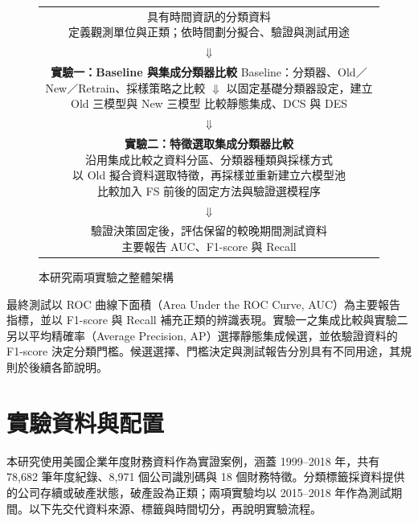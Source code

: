 \begin{figure}[htbp]
\centering
\begingroup
\small
{}
\setlength{\fboxsep}{8pt}
\begin{tabular}{@{}c@{}}
\fbox{\parbox{0.88\linewidth}{\centering 具有時間資訊的分類資料\\
定義觀測單位與正類；依時間劃分擬合、驗證與測試用途}}\\[3pt]
\(\Downarrow\)\\[3pt]
\fbox{\parbox{0.88\linewidth}{\centering\textbf{實驗一：Baseline 與集成分類器比較}\\[4pt]
Baseline：分類器、Old／New／Retrain、採樣策略之比較\\
\(\Downarrow\)\\
以固定基礎分類器設定，建立 Old 三模型與 New 三模型\\
比較靜態集成、DCS 與 DES}}\\[3pt]
\(\Downarrow\)\\[3pt]
\fbox{\parbox{0.88\linewidth}{\centering\textbf{實驗二：特徵選取集成分類器比較}\\[4pt]
沿用集成比較之資料分區、分類器種類與採樣方式\\
以 Old 擬合資料選取特徵，再採樣並重新建立六模型池\\
比較加入 FS 前後的固定方法與驗證選模程序}}\\[3pt]
\(\Downarrow\)\\[3pt]
\fbox{\parbox{0.88\linewidth}{\centering 驗證決策固定後，評估保留的較晚期間測試資料\\
主要報告 AUC、F1-score 與 Recall}}
\end{tabular}
\endgroup
\caption{本研究兩項實驗之整體架構}\label{fig:method-overview}
\par{}
\end{figure}

最終測試以 ROC 曲線下面積（Area Under the ROC Curve, AUC）為主要報告指標，並以 F1-score 與 Recall 補充正類的辨識表現。實驗一之集成比較與實驗二另以平均精確率（Average Precision, AP）選擇靜態集成候選，並依驗證資料的 F1-score 決定分類門檻。候選選擇、門檻決定與測試報告分別具有不同用途，其規則於後續各節說明。

\clearpage
\section{實驗資料與配置}\label{sec:method-data}

本研究使用美國企業年度財務資料作為實證案例，涵蓋 1999--2018 年，共有 78,682 筆年度紀錄、8,971 個公司識別碼與 18 個財務特徵。分類標籤採資料提供的公司存續或破產狀態，破產設為正類；兩項實驗均以 2015--2018 年作為測試期間。以下先交代資料來源、標籤與時間切分，再說明實驗流程。

